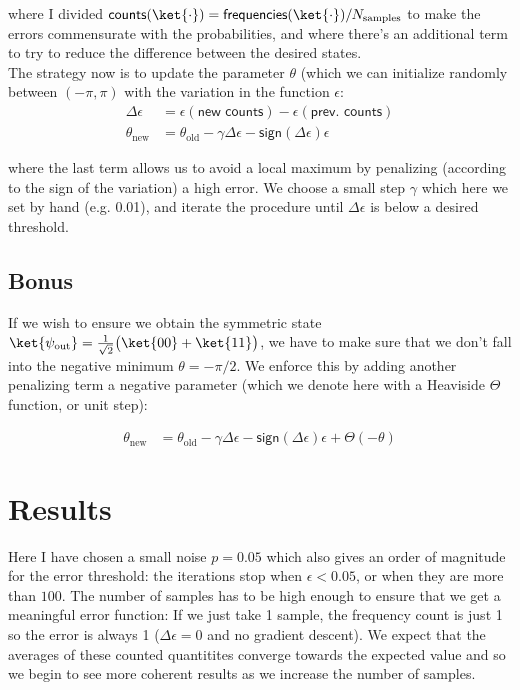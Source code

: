 \documentclass[11pt]{article}
\begin{document}
where I divided $\textsf{counts}(\ket{\cdot}) = \textsf{frequencies}(\ket{\cdot})/N_{\text{samples}}$ to make the errors commensurate with the probabilities, and where there's an additional term to try to reduce the difference between the desired states.
\\

The strategy now is to update the parameter $\theta$ (which we can initialize randomly between $(-\pi, \pi)$ with the variation in the function $\epsilon$:
\begin{align}
\Delta \epsilon &= \epsilon(\textsf{new  counts}) - \epsilon(\textsf{prev. counts})\\
\theta_\text{new} &= \theta_\text{old} - \gamma \Delta \epsilon -\textsf{sign}(\Delta \epsilon)\epsilon 
\end{align}

where the last term allows us to avoid a local maximum by penalizing (according to the sign of the variation) a high error. We choose a small step $\gamma$ which here we set by hand (e.g. 0.01), and iterate the procedure until $\Delta \epsilon$ is below a desired threshold.

\subsection{Bonus}

If we wish to ensure we obtain the symmetric state $\ket{\psi_{\text{out}}}= \frac{1}{\sqrt{2}} \big( \ket{00} +  \ket{11} \big)$, we have to make sure that we don't fall into the negative minimum $\theta = -\pi/2$. We enforce this by adding another penalizing term a negative parameter (which we denote here with a Heaviside $\Theta$ function, or unit step):

\begin{align}
\theta_\text{new} &= \theta_\text{old} - \gamma \Delta \epsilon -\textsf{sign}(\Delta \epsilon)\epsilon + \Theta(-\theta) 
\end{align}

\section{Results}

Here I have chosen a small noise $p = 0.05$ which also gives an order of magnitude for the error threshold: the iterations stop when $\epsilon < 0.05$, or when they are more than $100$. The number of samples has to be high enough to ensure that we get a meaningful error function: If we just take 1 sample, the frequency count   is just 1 so the error is always 1 ($\Delta \epsilon = 0$ and no gradient descent). We expect that the averages of these counted quantitites converge towards the expected value and so we begin to see more coherent results as we increase the number of samples.\\
\end{document}
